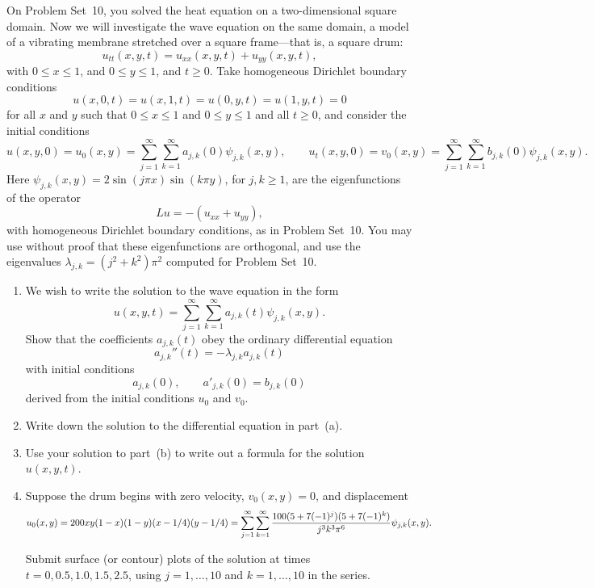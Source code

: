 On Problem Set~10, you solved the heat equation on a two-dimensional square domain.
Now we will investigate the wave equation on the same domain,
a model of a vibrating membrane stretched over a square frame---that 
is, a square drum:
\[ u_{tt}(x,y,t) = u_{xx}(x,y,t) + u_{yy}(x,y,t),\]
with $0\le x\le 1$, and $0\le y\le 1$, and $t\ge 0$.
Take homogeneous Dirichlet boundary conditions
\[ u(x,0,t) = u(x,1,t) = u(0,y,t) = u(1,y,t) = 0\]
for all $x$ and $y$ such that $0\le x\le 1$ and $0\le y\le 1$ and all $t\ge 0$,
and consider the initial conditions
\[  u(x,y,0) = u_0(x,y) = \sum_{j=1}^\infty \sum_{k=1}^\infty a_{j,k}(0) \psi_{j,k}(x,y), 
       \qquad
   u_t(x,y,0) = v_0(x,y) 
               = \sum_{j=1}^\infty \sum_{k=1}^\infty b_{j,k}(0) \psi_{j,k}(x,y).\]
      Here $\psi_{j,k}(x,y) = 2 \sin(j \pi x)\sin(k \pi y)$, 
      for $j, k\ge 1$,  are the eigenfunctions of the operator
       \[ L u = -(u_{xx} + u_{yy}),\]
      with homogeneous Dirichlet boundary conditions, as in Problem Set~10.
      You may use without proof that these eigenfunctions are orthogonal, 
      and use the eigenvalues $\lambda_{j,k} = (j^2+k^2)\pi^2$ computed 
      for Problem Set~10.

\begin{enumerate}
\item We wish to write the solution to the wave equation in the form
       \[ u(x,y,t) = \sum_{j=1}^\infty \sum_{k=1}^\infty a_{j,k}(t) \psi_{j,k}(x,y).\]
      Show that the coefficients $a_{j,k}(t)$ obey the ordinary differential equation
       \[ a_{j,k}''(t) = -\lambda_{j,k} a_{j,k}(t) \]
      with initial conditions
       \[ a_{j,k}(0), \qquad
         a'_{j,k}(0) = b_{j,k}(0)\]
      derived from the initial conditions $u_0$ and $v_0$.

\item Write down the solution to the differential equation in part~(a).

\item Use your solution to part~(b) to write out a formula for the solution $u(x,y,t)$.
       
\item Suppose the drum begins with zero velocity, $v_0(x,y)=0$, and displacement
         \[ u_0(x,y) = 200xy (1-x) (1-y)(x-1/4)(y-1/4) 
                     = \sum_{j=1}^\infty \sum_{k=1}^\infty 
                        {100 (5+7(-1)^j)(5+7(-1)^k)\over j^3 k^3 \pi^6} \psi_{j,k}(x,y). \]

      Submit surface (or contour) plots of the solution at times 
      $t=0, 0.5, 1.0, 1.5, 2.5$, using $j=1,\ldots,10$ and $k=1,\ldots,10$
      in the series.
\end{enumerate}

